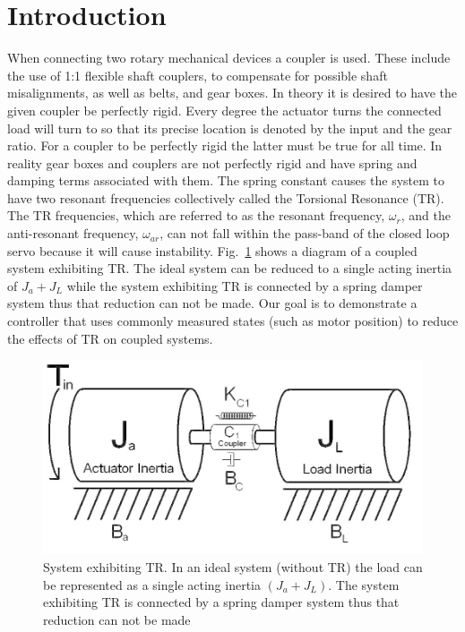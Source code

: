 \section{Introduction}

When connecting two rotary mechanical devices a coupler is used. 
These include the use of 1:1 flexible shaft couplers, to compensate for possible shaft misalignments, as well as belts, and gear boxes. 
In theory it is desired to have the given coupler be perfectly rigid. 
Every degree the actuator turns the connected load will turn to so that its precise location is denoted by the input and the gear ratio. 
For a coupler to be perfectly rigid the latter must be true for all time. 
In reality gear boxes and couplers are not perfectly rigid and have spring and damping terms associated with them. The spring constant causes the system to have two resonant frequencies collectively called the Torsional Resonance (TR). The TR frequencies, which are referred to as the resonant frequency, $\omega_r$, and the anti-resonant frequency, $\omega_{ar}$, can not fall within the pass-band of the closed loop servo because it will cause instability.  Fig.~\ref{fig:couple} shows a diagram of a coupled system exhibiting TR. The ideal system can be reduced to a single acting inertia of $J_a+J_L$ while the system exhibiting TR is connected by a spring damper system thus that reduction can not be made.  Our goal is to demonstrate a controller that uses commonly measured states (such as motor position) to reduce the effects of TR on coupled systems.

\begin{figure}[t]
  \centering
\includegraphics[width=1.0\columnwidth]{./pix/couple.png}
  \caption{System exhibiting TR. In an ideal
system (without TR) the load can be represented as a single acting inertia $(J_a+J_L)$.  The system exhibiting TR is connected by a
spring damper system thus that reduction can not be made\cite{lofaroTR}}
  \label{fig:couple}
\end{figure}

